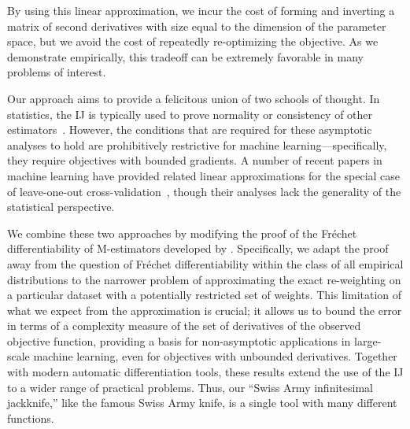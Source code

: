 By using this linear approximation, we incur the cost of forming and inverting a
matrix of second derivatives with size equal to the dimension of the parameter
space, but we avoid the cost of repeatedly re-optimizing the objective. As we
demonstrate empirically, this tradeoff can be extremely favorable in many
problems of interest.

Our approach aims to provide a felicitous union of two schools of thought. In
statistics, the IJ is typically used to prove normality or
consistency of other estimators~\citep{
fernholz:1983:mises,shao:1993:jackknifemestimator,shao:2012:jackknife}. However,
the conditions that are required for these asymptotic analyses to hold are
prohibitively restrictive for machine learning---specifically, they require
objectives with bounded gradients. A number of recent papers in machine learning
have provided related linear approximations for the special case of
leave-one-out cross-validation~\citep{KohL17, RadM18, BeiramiRST17}, though
their analyses lack the generality of the statistical perspective.

We combine these two approaches by modifying the proof of the Fr{\'e}chet
differentiability of M-estimators developed by \citet{clarke:1983:uniqueness}.
Specifically, we adapt the proof away from the question of Fr{\'e}chet
differentiability within the class of all empirical distributions to the
narrower problem of approximating the exact re-weighting on a particular dataset
with a potentially restricted set of weights.  This limitation of what we expect
from the approximation is crucial; it allows us to bound the error in terms of a
complexity measure of the set of derivatives of the observed objective function,
providing a basis for non-asymptotic applications in large-scale machine
learning, even for objectives with unbounded derivatives.  Together with modern
automatic differentiation tools, these results extend the use of the
IJ to a wider range of practical problems. Thus, our
``Swiss Army infinitesimal jackknife,'' like the famous Swiss Army knife, is a
single tool with many different functions.
